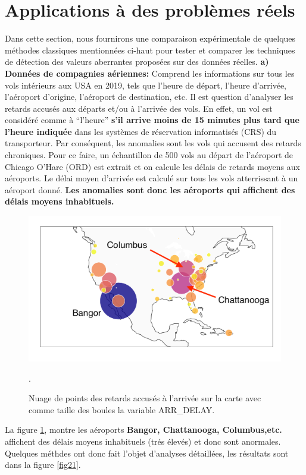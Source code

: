 \newpage

\section{Applications à des problèmes réels}
Dans cette section, nous fournirons une comparaison expérimentale de quelques méthodes classiques  mentionnées ci-haut  pour tester et comparer les techniques de détection des valeurs aberrantes proposées sur des données réelles. \newl
\textbf{a) Données de compagnies aériennes:} Comprend les informations sur tous les vols intérieurs aux USA  en 2019, tels que l'heure de départ, l'heure d'arrivée, l'aéroport d'origine, l'aéroport de destination, etc.  Il est question d’analyser les retards accusés aux  départs et/ou à l’arrivée des vols. En effet, un vol est considéré comme à “l’heure”  \textbf{s’il arrive moins de 15 minutes plus tard que l'heure indiquée} dans les systèmes de réservation informatisés (CRS) du transporteur. Par conséquent, les anomalies sont les vols qui accusent des retards chroniques. Pour ce faire,  un échantillon de 500 vols au départ de l’aéroport de Chicago O’Hare (ORD) est extrait et on calcule les délais de retards moyens aux aéroports. Le délai moyen d’arrivée est calculé sur tous les vols atterrissant à un aéroport donné.\textbf{ Les anomalies sont donc les aéroports qui affichent des délais moyens inhabituels.}
\begin{figure}[H]
    \centering
    \includegraphics[width=.50\textwidth]{ADOA/Images/vols1.png}
    \caption{Nuage de points des retards accusés à l'arrivée sur la carte avec comme taille des boules la variable ARR\_DELAY.}%
    \label{fig20}.
\end{figure}
\noindent La figure \ref{fig20}, montre les aéroports \textbf{Bangor, Chattanooga, Columbus,etc.} affichent des délais moyens inhabituels (trés élevés) et donc sont anormales. Quelques méthdes ont donc fait l'objet d'analyses détaillées, les résultats sont dans la figure \ref{fig21}.
